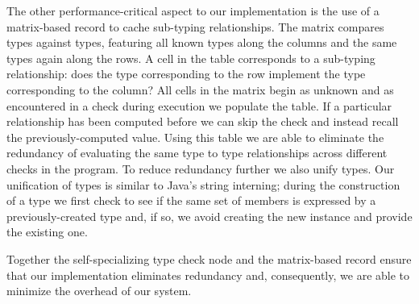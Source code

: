 The other performance-critical aspect to our implementation
is the use of a matrix-based record to cache sub-typing relationships.
The matrix compares types against types,
featuring all known types along the columns and the same types again along the rows.
A cell in the table corresponds to a sub-typing relationship:
does the type corresponding to the row implement
the type corresponding to the column?
All cells in the matrix begin as unknown and as 
encountered in a check during execution
we populate the table.
If a particular relationship has been computed before
we can skip the check and instead recall the previously-computed value.
Using this table we are able to eliminate the redundancy of evaluating
the same type to type relationships across different checks in the program. To reduce redundancy further we also unify types.
Our unification of types is similar to Java's string interning; 
during the construction of a type we first check to see if the same
set of members is expressed by a previously-created type and, if so,
we avoid creating the new instance and provide the existing one.

Together the self-specializing type check node and the matrix-based record
ensure that our implementation eliminates redundancy and,
consequently, we are able to minimize the overhead of our system. 

